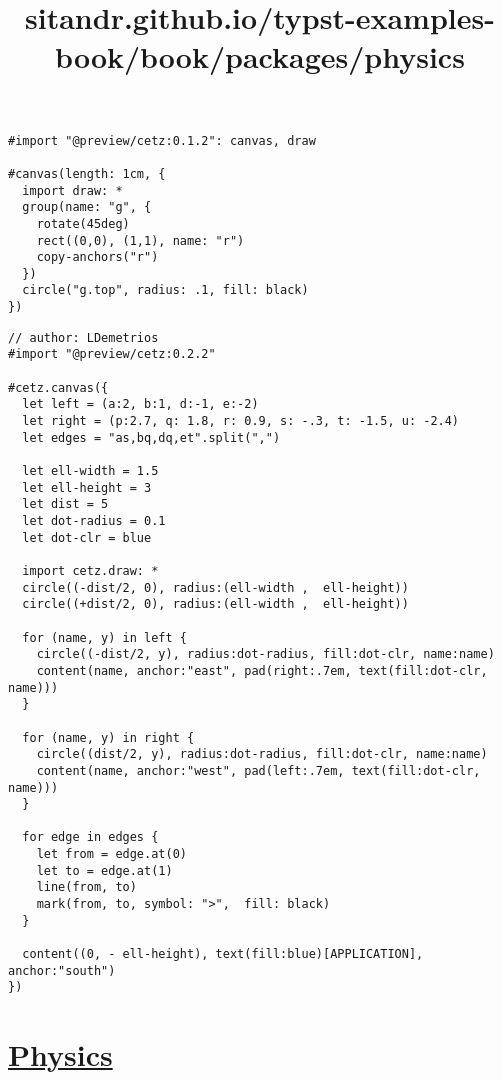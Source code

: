 \pandocbounded{}

\begin{verbatim}
#import "@preview/cetz:0.1.2": canvas, draw

#canvas(length: 1cm, {
  import draw: *
  group(name: "g", {
    rotate(45deg)
    rect((0,0), (1,1), name: "r")
    copy-anchors("r")
  })
  circle("g.top", radius: .1, fill: black)
})
\end{verbatim}

\pandocbounded{}

\begin{verbatim}
// author: LDemetrios
#import "@preview/cetz:0.2.2"

#cetz.canvas({
  let left = (a:2, b:1, d:-1, e:-2)
  let right = (p:2.7, q: 1.8, r: 0.9, s: -.3, t: -1.5, u: -2.4)
  let edges = "as,bq,dq,et".split(",")

  let ell-width = 1.5
  let ell-height = 3
  let dist = 5
  let dot-radius = 0.1
  let dot-clr = blue

  import cetz.draw: *
  circle((-dist/2, 0), radius:(ell-width ,  ell-height))
  circle((+dist/2, 0), radius:(ell-width ,  ell-height))

  for (name, y) in left {
    circle((-dist/2, y), radius:dot-radius, fill:dot-clr, name:name)
    content(name, anchor:"east", pad(right:.7em, text(fill:dot-clr, name)))
  }

  for (name, y) in right {
    circle((dist/2, y), radius:dot-radius, fill:dot-clr, name:name)
    content(name, anchor:"west", pad(left:.7em, text(fill:dot-clr, name)))
  }

  for edge in edges {
    let from = edge.at(0)
    let to = edge.at(1)
    line(from, to)
    mark(from, to, symbol: ">",  fill: black)
  }

  content((0, - ell-height), text(fill:blue)[APPLICATION], anchor:"south")
})
\end{verbatim}

\pandocbounded{}


\title{sitandr.github.io/typst-examples-book/book/packages/physics}

\section{\texorpdfstring{\hyperref[physics]{Physics}}{Physics}}\label{physics}

